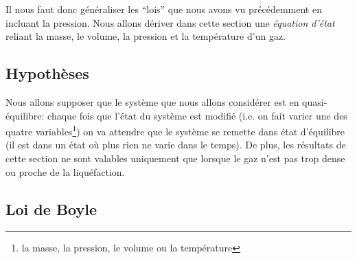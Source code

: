 \documentclass[a4paper,12pt]{book}
\begin{document}
Il nous faut donc généraliser les ``lois'' que nous avons vu précédemment en incluant la pression. Nous allons dériver dans cette section une \textit{équation d'état} reliant la masse, le volume, la pression et la température d'un gaz.  



\subsection{Hypothèses}

Nous allons supposer que le système que nous allons considérer
est en quasi-équilibre: chaque fois que l'état du système est 
modifié (i.e. on fait varier une des quatre variables\footnote{
la masse, la pression, le volume ou la température}) on va 
attendre que le système se remette dans état d'équilibre (il est 
dans un état où plus rien ne varie dans le temps). De plus, les 
résultats de cette section ne sont valables uniquement que
lorsque le gaz n'est pas trop dense ou proche de la liquéfaction.

\subsection{Loi de Boyle}
\end{document}
